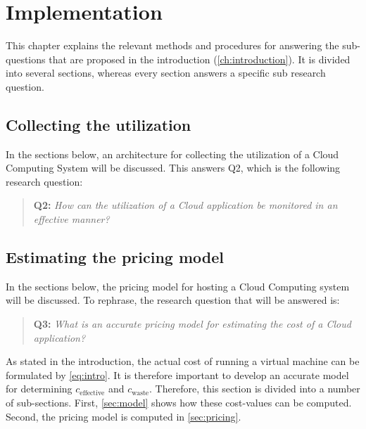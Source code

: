 \chapter{Implementation}\label{ch:implementation}
This chapter explains the relevant methods and procedures for answering the sub-questions that are proposed in the introduction (\autoref{ch:introduction}). It is divided into several sections, whereas every section answers a specific sub research question.

\section{Collecting the utilization} \label{sec:collect_utilization}
In the sections below, an architecture for collecting the utilization of a Cloud Computing System will be discussed. This answers Q2, which is the following research question:

\begin{quote}
	\textbf{Q2: }\textit{How can the utilization of a Cloud application be monitored in an effective manner?}\\
\end{quote}


\section{Estimating the pricing model} \label{sec:cost}
In the sections below, the pricing model for hosting a Cloud Computing system will be discussed. To rephrase, the research question that will be answered is:

\begin{quote}
	\textbf{Q3: }\textit{What is an accurate pricing model for estimating the cost of a Cloud application?}\\
\end{quote}

As stated in the introduction, the actual cost of running a virtual machine can be formulated by \autoref{eq:intro}. It is therefore important to develop an accurate model for determining $c_\text{effective}$ and $c_\text{waste}$. Therefore, this section is divided into a number of sub-sections. First, \autoref{sec:model} shows how these cost-values can be computed. Second, the pricing model is computed in \autoref{sec:pricing}.

